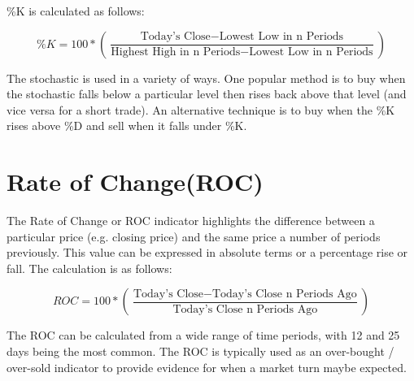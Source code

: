\%K is calculated as follows: 

\[ \%K = 100 * \left( \dfrac{\text{Today's Close} - \text{Lowest Low in n Periods}}{\text{Highest High in n Periods} - \text{Lowest Low in n Periods}} \right) \]

The stochastic is used in a variety of ways. One popular method is to buy when the stochastic falls below a particular level then rises back above that level (and vice versa for a short trade). An alternative technique is to buy when the \%K rises above \%D and sell when it falls under \%K.

\section{Rate of Change(ROC)}
\label{appB:roc}
The Rate of Change or ROC indicator highlights the difference between a particular price (e.g. closing price) and the same price a number of periods previously. This value can be expressed in absolute terms or a percentage rise or fall. The calculation is as follows: 

\[ ROC = 100 * \left( \dfrac{ \text{Today's Close} - \text{Today's Close n Periods Ago}}{\text{Today's Close n Periods Ago}} \right) \]

The ROC can be calculated from a wide range of time periods, with 12 and 25 days being the most common. The ROC is typically used as an over-bought / over-sold indicator to provide evidence for when a market turn maybe expected.